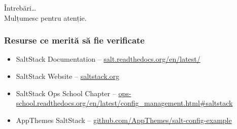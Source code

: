 \documentclass[compress]{beamer}
\begin{document}
\begin{frame}
  \begin{center}
  \huge Întrebări\ldots
  \\
  Mulțumesc pentru atenție.
  \end{center}
\end{frame}

\begin{frame}
\frametitle{Resurse ce merită să fie verificate}

\begin{itemize}
  \item SaltStack Documentation -- \href{http://salt.readthedocs.org/en/latest/}{salt.readthedocs.org/en/latest/}
  \item SaltStack Website -- \href{http://saltstack.com/about.html}{saltstack.org}
  \item SaltStack Ops School Chapter -- \href{http://ops-school.readthedocs.org/en/latest/config\_management.html\#saltstack}{ops-school.readthedocs.org/en/latest/config\_management.html\#saltstack}
  \item AppThemes SaltStack -- \href{https://github.com/AppThemes/salt-config-example}{github.com/AppThemes/salt-config-example}
\end{itemize}

\end{frame}
\end{document}
